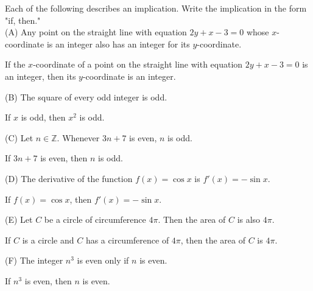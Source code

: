 \documentclass[12pt]{article}
\newcommand{\Z}{\mathbb{Z}}
\newenvironment{problem}[2][Problem]{\begin{trivlist}
		\item[\hskip \labelsep {\bfseries #1}\hskip \labelsep {\bfseries #2.}]}{\end{trivlist}}
\newenvironment{solution}[2][Solution]{\begin{trivlist}
		\item[\hskip \labelsep {\bfseries #1}\hskip \labelsep {\bfseries #2.}]}{\end{trivlist}}
\begin{document}
\begin{problem}{34}
	Each of the following describes an implication. Write the implication in the form "if, then."\\
	
	(A) Any point on the straight line with equation $2y + x -3 = 0$ whose $x$-coordinate is an integer also has an integer for its $y$-coordinate.
	\begin{solution}{a}
		If the $x$-coordinate of a point on the straight line with equation $2y + x -3 = 0$ is an integer, then its $y$-coordinate is an integer.
	\end{solution}

	(B) The square of every odd integer is odd.
	\begin{solution}{b}
		If $x$ is odd, then $x^{2}$ is odd.
	\end{solution}

	(C) Let $n \in \Z$. Whenever $3n + 7$ is even, $n$ is odd.
	\begin{solution}{c}
		If $3n+7$ is even, then $n$ is odd.
	\end{solution}

	(D) The derivative of the function $f(x) = \cos{x}$ is $f'(x) = -\sin{x}$.
	\begin{solution}{d}
		If $f(x) = \cos{x}$, then $f'(x) = -\sin{x}$.
	\end{solution}

	(E) Let $C$ be a circle of circumference $4\pi$. Then the area of $C$ is also $4\pi$.
	\begin{solution}{e}
		If $C$ is a circle and $C$ has a circumference of $4\pi$, then the area of $C$ is $4\pi$.
	\end{solution}
	
	(F) The integer $n^{3}$ is even only if $n$ is even.
	\begin{solution}{f}
		If $n^{3}$ is even, then $n$ is even.
	\end{solution}
\end{problem}
\end{document}
